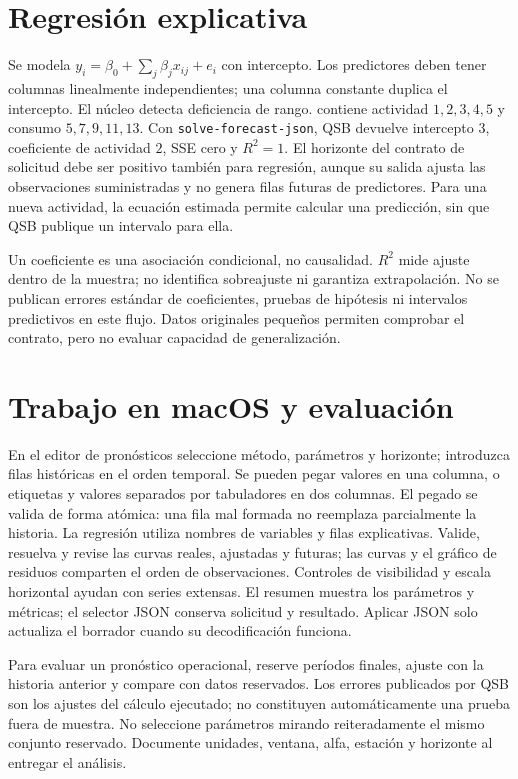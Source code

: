 \section{Regresión explicativa}
Se modela \(y_i=\beta_0+\sum_j\beta_jx_{ij}+e_i\) con intercepto.
Los predictores deben tener columnas linealmente independientes; una columna
constante duplica el intercepto. El núcleo detecta deficiencia de rango.
 contiene actividad \(1,2,3,4,5\) y consumo
\(5,7,9,11,13\). Con \texttt{solve-forecast-json}, QSB devuelve intercepto
\(3\), coeficiente de actividad \(2\), SSE cero y \(R^2=1\).
El horizonte del contrato de solicitud debe ser positivo también para
regresión, aunque su salida ajusta las observaciones suministradas y no genera
filas futuras de predictores. Para una nueva actividad, la ecuación estimada
permite calcular una predicción, sin que QSB publique un intervalo para ella.

Un coeficiente es una asociación condicional, no causalidad. \(R^2\) mide
ajuste dentro de la muestra; no identifica sobreajuste ni garantiza
extrapolación. No se publican errores estándar de coeficientes, pruebas de
hipótesis ni intervalos predictivos en este flujo. Datos originales pequeños
permiten comprobar el contrato, pero no evaluar capacidad de generalización.

\section{Trabajo en macOS y evaluación}
En el editor de pronósticos seleccione método, parámetros y horizonte; introduzca
filas históricas en el orden temporal. Se pueden pegar valores en una columna,
o etiquetas y valores separados por tabuladores en dos columnas. El pegado se
valida de forma atómica: una fila mal formada no reemplaza parcialmente la
historia. La regresión utiliza nombres de variables y filas explicativas.
Valide, resuelva y revise las curvas reales, ajustadas y futuras; las curvas y
el gráfico de residuos comparten el orden de observaciones. Controles de
visibilidad y escala horizontal ayudan con series extensas. El resumen muestra
los parámetros y métricas; el selector JSON conserva solicitud y resultado.
Aplicar JSON solo actualiza el borrador cuando su decodificación funciona.

Para evaluar un pronóstico operacional, reserve períodos finales, ajuste con
la historia anterior y compare con datos reservados. Los errores publicados por
QSB son los ajustes del cálculo ejecutado; no constituyen automáticamente una
prueba fuera de muestra. No seleccione parámetros mirando reiteradamente el
mismo conjunto reservado. Documente unidades, ventana, alfa, estación y horizonte
al entregar el análisis.

